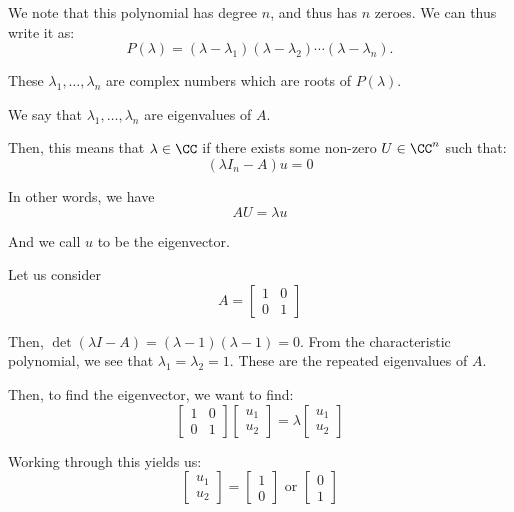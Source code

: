 \documentclass[openany]{book}
\begin{document}
We note that this polynomial has degree $n$, and thus has $n$ zeroes. We can thus write it as:
\begin{equation*}
	P(\lambda) = (\lambda-\lambda_1)(\lambda - \lambda_2)\cdots(\lambda-\lambda_n).
\end{equation*}

These $\lambda_1, \ldots, \lambda_n$ are complex numbers which are roots of $P(\lambda)$.

\begin{defn}[Eigenvalue]
	We say that $\lambda_1, \ldots, \lambda_n$ are eigenvalues of $A$.
	
	Then, this means that $\lambda \in \CC$ if there exists some non-zero $U \in \CC^{n}$ such that:
	\begin{equation*}
		(\lambda I_n - A)u = 0
	\end{equation*}

	In other words, we have
	\begin{equation*}
		AU = \lambda u
	\end{equation*}

	And we call $u$ to be the eigenvector.
\end{defn}
\begin{example}
	Let us consider
	\begin{equation*}
		A = \begin{bmatrix}
			1 & 0 \\ 0 & 1
		\end{bmatrix}
	\end{equation*}
	
	Then, $\det(\lambda I - A) = (\lambda - 1)(\lambda - 1) = 0$. From the characteristic polynomial, we see that $\lambda_1 = \lambda_2 = 1$. These are the repeated eigenvalues of $A$.
	
	Then, to find the eigenvector, we want to find:
	\begin{equation*}
		\begin{bmatrix}
			 1 & 0 \\ 0 & 1 
		\end{bmatrix}\begin{bmatrix}
		 u_1 \\ u_2
	\end{bmatrix} = \lambda\begin{bmatrix}
	u_1 \\ u_2
\end{bmatrix}
	\end{equation*}

	Working through this yields us:
	\begin{equation*}
		\begin{bmatrix}
			u_1\\u_2
		\end{bmatrix} = \begin{bmatrix}
		1 \\ 0
	\end{bmatrix}
 	\text{ or }
 		\begin{bmatrix}
 			0 \\ 1
 		\end{bmatrix}
	\end{equation*}
\end{example}
\end{document}

